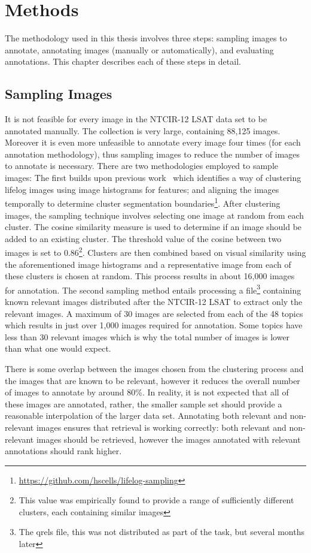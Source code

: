 \chapter{Methods}\label{chapter:methodology}

The methodology used in this thesis involves three steps: sampling images to annotate, annotating images (manually or automatically), and evaluating annotations. This chapter describes each of these steps in detail.

\section{Sampling Images}

It is not feasible for every image in the NTCIR-12 LSAT data set to be annotated manually. The collection is very large, containing 88,125 images. Moreover it is even more unfeasible to annotate every image four times (for each annotation methodology), thus sampling images to reduce the number of images to annotate is necessary. There are two methodologies employed to sample images: The first builds upon previous work~\cite{scells2016qut} which identifies a way of clustering lifelog images using image histograms for features; and aligning the images temporally to determine cluster segmentation boundaries\footnote{\url{https://github.com/hscells/lifelog-sampling}}. After clustering images, the sampling technique involves selecting one image at random from each cluster. The cosine similarity measure is used to determine if an image should be added to an existing cluster. The threshold value of the cosine between two images is set to 0.86\footnote{This value was empirically found to provide a range of sufficiently different clusters, each containing similar images}. Clusters are then combined based on visual similarity using the aforementioned image histograms and a representative image from each of these clusters is chosen at random. This process results in about 16,000 images for annotation. The second sampling method entails processing a file\footnote{The qrels file, this was not distributed as part of the task, but several months later} containing known relevant images distributed after the NTCIR-12 LSAT to extract only the relevant images. A maximum of 30 images are selected from each of the 48 topics which results in just over 1,000 images required for annotation. Some topics have less than 30 relevant images which is why the total number of images is lower than what one would expect.

There is some overlap between the images chosen from the clustering process and the images that are known to be relevant, however it reduces the overall number of images to annotate by around 80\%. In reality, it is not expected that all of these images are annotated, rather, the smaller sample set should provide a reasonable interpolation of the larger data set. Annotating both relevant and non-relevant images ensures that retrieval is working correctly: both relevant and non-relevant images should be retrieved, however the images annotated with relevant annotations should rank higher.

